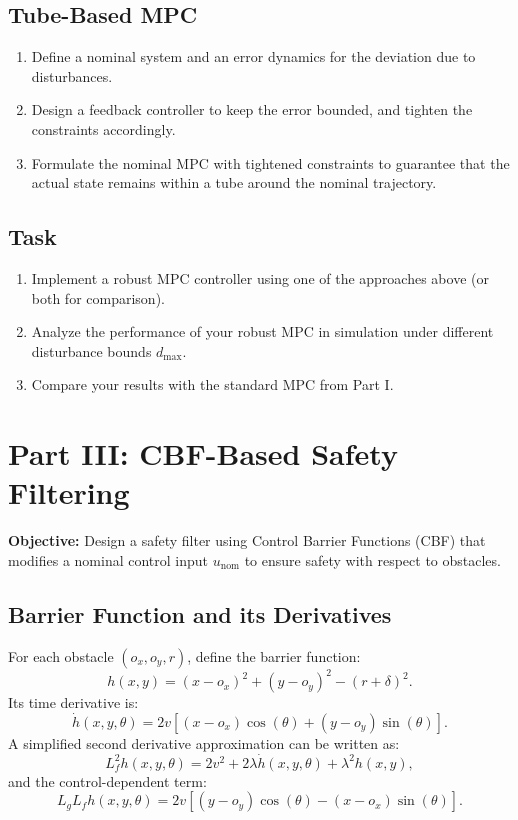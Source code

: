 \documentclass[11pt]{article}
\begin{document}
\subsection{Tube-Based MPC}
\begin{enumerate}[label=\arabic*.]
    \item Define a nominal system and an error dynamics for the deviation due to disturbances.
    \item Design a feedback controller to keep the error bounded, and tighten the constraints accordingly.
    \item Formulate the nominal MPC with tightened constraints to guarantee that the actual state remains within a tube around the nominal trajectory.
\end{enumerate}

\subsection{Task}
\begin{enumerate}[label=\arabic*.]
    \item Implement a robust MPC controller using one of the approaches above (or both for comparison).
    \item Analyze the performance of your robust MPC in simulation under different disturbance bounds $d_{\max}$.
    \item Compare your results with the standard MPC from Part I.
\end{enumerate}

\section{Part III: CBF-Based Safety Filtering}
\textbf{Objective:} Design a safety filter using Control Barrier Functions (CBF) that modifies a nominal control input $u_{\text{nom}}$ to ensure safety with respect to obstacles.

\subsection{Barrier Function and its Derivatives}
For each obstacle $(o_x, o_y, r)$, define the barrier function:
\[
h(x,y) = (x - o_x)^2 + (y - o_y)^2 - (r + \delta)^2.
\]
Its time derivative is:
\[
\dot{h}(x,y,\theta) = 2 v \left[ (x - o_x) \cos(\theta) + (y - o_y) \sin(\theta) \right].
\]
A simplified second derivative approximation can be written as:
\[
L_f^2 h(x,y,\theta) = 2v^2 + 2\lambda \dot{h}(x,y,\theta) + \lambda^2 h(x,y),
\]
and the control-dependent term:
\[
L_g L_f h(x,y,\theta) = 2v \left[ (y - o_y) \cos(\theta) - (x - o_x) \sin(\theta) \right].
\]
\end{document}
